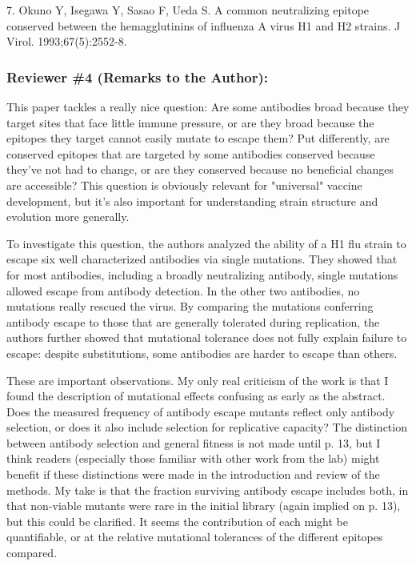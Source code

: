 \documentclass[11pt, oneside]{article}   	%
\begin{document}
7.  Okuno Y, Isegawa Y, Sasao F, Ueda S. A common neutralizing epitope conserved between the hemagglutinins of influenza A virus H1 and H2 strains. J Virol. 1993;67(5):2552-8.


\subsubsection*{Reviewer \#4 (Remarks to the Author):}

This paper tackles a really nice question: Are some antibodies broad because they target sites that face little immune pressure, or are they broad because the epitopes they target cannot easily mutate to escape them? Put differently, are conserved epitopes that are targeted by some antibodies conserved because they've not had to change, or are they conserved because no beneficial changes are accessible? This question is obviously relevant for "universal" vaccine development, but it's also important for understanding strain structure and evolution more generally.

To investigate this question, the authors analyzed the ability of a H1 flu strain to escape six well characterized antibodies via single mutations. They showed that for most antibodies, including a broadly neutralizing antibody, single mutations allowed escape from antibody detection. In the other two antibodies, no mutations really rescued the virus. By comparing the mutations conferring antibody escape to those that are generally tolerated during replication, the authors further showed that mutational tolerance does not fully explain failure to escape: despite substitutions, some antibodies are harder to escape than others. 

These are important observations. My only real criticism of the work is that I found the description of mutational effects confusing as early as the abstract. Does the measured frequency of antibody escape mutants reflect only antibody selection, or does it also include selection for replicative capacity? The distinction between antibody selection and general fitness is not made until p. 13, but I think readers (especially those familiar with other work from the lab) might benefit if these distinctions were made in the introduction and review of the methods. My take is that the fraction surviving antibody escape includes both, in that non-viable mutants were rare in the initial library (again implied on p. 13), but this could be clarified. It seems the contribution of each might be quantifiable, or at the relative mutational tolerances of the different epitopes compared. 
\end{document}

